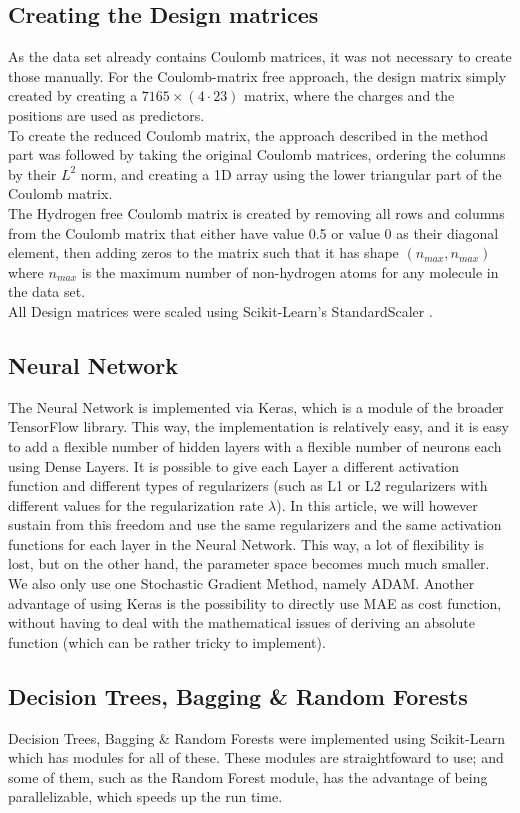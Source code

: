 \documentclass[11pt,a4paper,notitlepage]{article}
\begin{document}
\subsection{Creating the Design matrices}
As the data set already contains Coulomb matrices, it was not necessary to create those manually. For the Coulomb-matrix free approach, the design matrix simply created by creating a $7165\times (4\cdot23)$ matrix, where the charges and the positions are used as predictors.\\
To create the reduced Coulomb matrix, the approach described in the method part was followed by taking the original Coulomb matrices, ordering the columns by their $L^2$ norm, and creating a 1D array using the lower triangular part of the Coulomb matrix.\\
The Hydrogen free Coulomb matrix is created by removing all rows and columns from the Coulomb matrix that either have value 0.5 or value 0 as their diagonal element, then adding zeros to the matrix such that it has shape $(n_{max},n_{max})$ where $n_{max}$ is the maximum number of non-hydrogen atoms for any molecule in the data set.\\
All Design matrices were scaled using Scikit-Learn's StandardScaler \citep{scikit-learn}. 
\subsection{Neural Network}
The Neural Network is implemented via Keras, which is a module of the broader TensorFlow \citep{tensorflow2015-whitepaper} library. This way, the implementation is relatively easy, and it is easy to add a flexible number of hidden layers with a flexible number of neurons each using Dense Layers. It is possible to give each Layer a different activation function and different types of regularizers (such as L1 or L2 regularizers with different values for the regularization rate $\lambda$). In this article, we will however sustain from this freedom and use the same regularizers and the same activation functions for each layer in the Neural Network. This way, a lot of flexibility is lost, but on the other hand, the parameter space becomes much much smaller. We also only use one Stochastic Gradient Method, namely ADAM. Another advantage of using Keras is the possibility to directly use MAE as cost function, without having to deal with the mathematical issues of deriving an absolute function (which can be rather tricky to implement). 
\subsection{Decision Trees, Bagging \& Random Forests}
Decision Trees, Bagging \& Random Forests were implemented using Scikit-Learn \citep{scikit-learn} which has modules for all of these. These modules are straightfoward to use; and some of them, such as the Random Forest module, has the advantage of being parallelizable, which speeds up the run time. 
\end{document}
